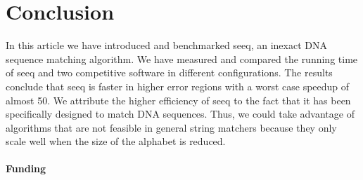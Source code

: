\documentclass{bioinfo}
\begin{document}
\section{Conclusion}

In this article we have introduced and benchmarked seeq, an inexact
DNA sequence matching algorithm. We have measured and compared the
running time of seeq and two competitive software in different
configurations. The results conclude that seeq is faster in higher
error regions with a worst case speedup of almost 50. We attribute
the higher efficiency of seeq to the fact that it has been
specifically designed to match DNA sequences. Thus, we could take
advantage of algorithms that are not feasible in general string
matchers because they only scale well when the size of the alphabet is
reduced.

\paragraph{Funding\textcolon}



%
%
%
%
%
%
%

\end{document}
